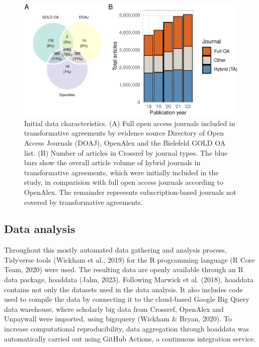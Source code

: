 \documentclass[a4paper,man,floatsintext,longtable,noextraspace,12pt]{apa6}
\begin{document}
\begin{figure}[ht!]

{\centering \includegraphics[width=0.99\linewidth,]{fig/method_fig-1} 

}

\caption{Initial data characteristics. (A) Full open access journals included in transformative agreements by evidence source Directory of Open Access Journals (DOAJ), OpenAlex and the Bielefeld GOLD OA list. (B) Number of articles in Crossref by journal types. The blue bars show the overall article volume of hybrid journals in transformative agreements, which were initially included in the study, in comparision with full open access journals according to OpenAlex. The remainder represents subscription-based journals not covered by transformative agreements.}\label{fig:method_fig}
\end{figure}

\hypertarget{data-analysis}{%
\subsection{Data analysis}\label{data-analysis}}

Throughout this mostly automated data gathering and analysis process,
Tidyverse tools (Wickham et al., 2019) for the R programming language (R
Core Team, 2020) were used. The resulting data are openly available
through an R data package, hoaddata (Jahn, 2023). Following Marwick et
al. (2018), hoaddata contains not only the datasets used in the data
analysis. It also includes code used to compile the data by connecting
it to the cloud-based Google Big Query data warehouse, where scholarly
big data from Crossref, OpenAlex and Unpaywall were imported, using
bigrquery (Wickham \& Bryan, 2020). To increase computational
reproducibility, data aggregation through hoaddata was automatically
carried out using GitHub Actions, a continuous integration service.
\end{document}

